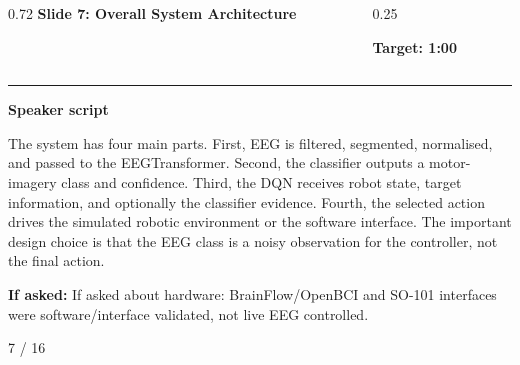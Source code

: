 \documentclass[aspectratio=169,10pt]{beamer}
\begin{document}
\begin{frame}[plain]
\vspace*{0.16cm}
\begin{columns}[T,totalwidth=\textwidth]
\begin{column}{0.72\textwidth}
{\fontsize{17}{18.5}\selectfont\bfseries Slide 7: Overall System Architecture}
\end{column}
\begin{column}{0.25\textwidth}
\raggedleft
\colorbox{noteCream}{\parbox{0.88\linewidth}{\centering\bfseries Target: 1:00}}
\end{column}
\end{columns}
\vspace{0.10cm}
{\color{uomPurple}\rule{\textwidth}{1.2pt}}
\vspace{0.18cm}
{\color{uomPurple}\bfseries Speaker script}
\vspace{0.06cm}
\setlength{\fboxsep}{6pt}
\noindent\colorbox{panelGrey}{\begin{minipage}{0.94\textwidth}
\justifying\fontsize{11.0}{13.4}\selectfont
The system has four main parts. First, EEG is filtered, segmented, normalised, and passed to the EEGTransformer. Second, the classifier outputs a motor-imagery class and confidence. Third, the DQN receives robot state, target information, and optionally the classifier evidence. Fourth, the selected action drives the simulated robotic environment or the software interface. The important design choice is that the EEG class is a noisy observation for the controller, not the final action.
\end{minipage}}
\vspace{0.22cm}
\noindent\colorbox{noteCream}{\begin{minipage}{0.94\textwidth}
\fontsize{9.6}{11.6}\selectfont
{\bfseries If asked:} If asked about hardware: BrainFlow/OpenBCI and SO-101 interfaces were software/interface validated, not live EEG controlled.
\end{minipage}}
\vfill
\hfill{\color{textDark}\scriptsize 7 / 16}
\end{frame}
\end{document}
